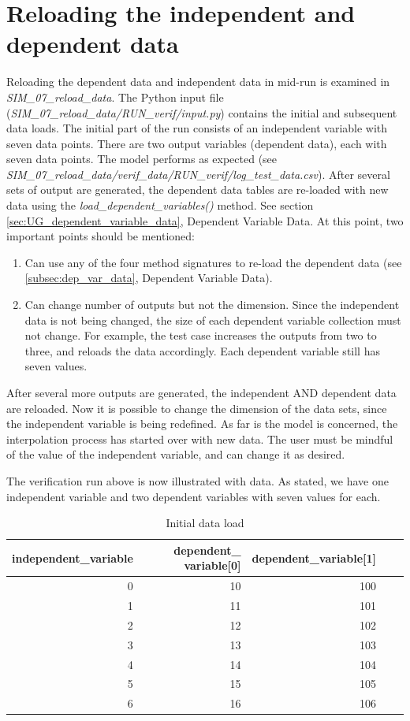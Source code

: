 \documentclass[11pt,fleqn]{report}
\begin{document}
\section{Reloading the independent and dependent data}
\label{sec:UG_reloading_data}
Reloading the dependent data and independent data in mid-run is examined
in \textit{SIM\_07\_reload\_data}.  The Python input file
(\textit{SIM\_07\_reload\_data/RUN\_verif/input.py}) contains the initial
and subsequent data loads.  The initial part of the run consists of an
independent variable with seven data points.  There are two output
variables (dependent data), each with seven data points.  The model
performs as expected (see
\textit{SIM\_07\_reload\_data/verif\_data/RUN\_verif/log\_test\_data.csv}).
After several sets of output are generated, the dependent data tables are
re-loaded with new data using the \textit{load\_dependent\_variables()}
method.  See section \ref{sec:UG_dependent_variable_data}, Dependent
Variable Data.  At this point, two important points should be mentioned:
\begin{enumerate}
  \item Can use any of the four method signatures to re-load the dependent
    data (see \ref{subsec:dep_var_data}, Dependent Variable Data).
  \item Can change number of outputs but not the dimension.  Since the
    independent data is not being changed, the size of each dependent variable
    collection must not change.  For example, the test case increases the
    outputs from two to three, and reloads the data accordingly.  Each
    dependent variable still has seven values.
\end{enumerate}
After several more outputs are generated, the independent AND dependent data
are reloaded.  Now it is possible to change the dimension of the data sets,
since the independent variable is being redefined.  As far is the model is
concerned, the interpolation process has started over with new data.  The user
must be mindful of the value of the independent variable, and can change it as
desired.

The verification run above is now illustrated with data.  As stated, we have
one independent variable and two dependent variables with seven values for each.
\begin{table}[H]
\caption{Initial data load}
\begin{center}
\begin{tabular}{|r|r|r|r|r|} \hline
independent\_variable & dependent\_ variable[0] & dependent\_variable[1] \\
\hline\hline
0 & 10 & 100 \\ \hline
1 & 11 & 101 \\ \hline
2 & 12 & 102 \\ \hline
3 & 13 & 103 \\ \hline
4 & 14 & 104 \\ \hline
5 & 15 & 105 \\ \hline
6 & 16 & 106 \\ \hline
\end{tabular}
\end{center}
\end{table}
\end{document}

